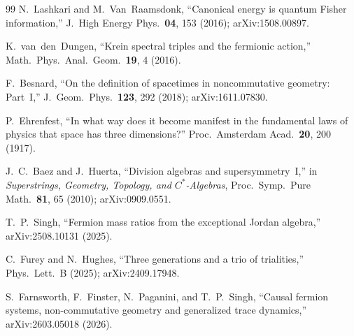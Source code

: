 \documentclass[prl,twocolumn,superscriptaddress,longbibliography]{revtex4-2}
\begin{document}
\begin{thebibliography}{99}
N.~Lashkari and M.~Van~Raamsdonk,
``Canonical energy is quantum Fisher information,''
J.\ High Energy Phys.\ \textbf{04}, 153 (2016);
arXiv:1508.00897.

K.~van~den~Dungen,
``Krein spectral triples and the fermionic action,''
Math.\ Phys.\ Anal.\ Geom.\ \textbf{19}, 4 (2016).

F.~Besnard,
``On the definition of spacetimes in noncommutative
geometry: Part~I,''
J.\ Geom.\ Phys.\ \textbf{123}, 292 (2018);
arXiv:1611.07830.

P.~Ehrenfest,
``In what way does it become manifest in the
fundamental laws of physics that space has three
dimensions?''
Proc.\ Amsterdam Acad.\ \textbf{20}, 200 (1917).

J.~C.~Baez and J.~Huerta,
``Division algebras and supersymmetry~I,''
in \emph{Superstrings, Geometry, Topology,
and $C^*$-Algebras}, Proc.\ Symp.\ Pure Math.\
\textbf{81}, 65 (2010);
arXiv:0909.0551.

T.~P.~Singh,
``Fermion mass ratios from the exceptional Jordan algebra,''
arXiv:2508.10131 (2025).

C.~Furey and N.~Hughes,
``Three generations and a trio of trialities,''
Phys.\ Lett.\ B (2025);
arXiv:2409.17948.

S.~Farnsworth, F.~Finster, N.~Paganini, and T.~P.~Singh,
``Causal fermion systems, non-commutative geometry
and generalized trace dynamics,''
arXiv:2603.05018 (2026).

\end{thebibliography}
\end{document}
